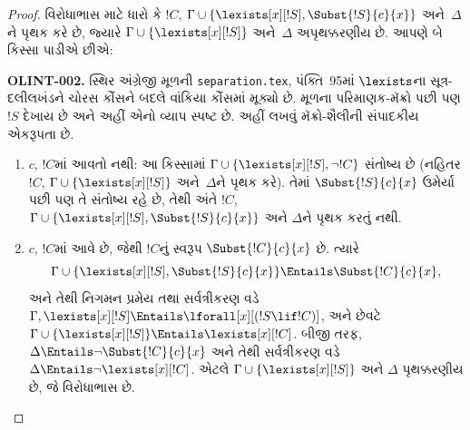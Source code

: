 \documentclass[../../../include/open-logic-section]{subfiles}
\begin{document}
\begin{proof}
વિરોધાભાસ માટે ધારો કે $!C$, $\Gamma \cup \{ \lexists[x][!S],
\Subst{!S}{c}{x}\}$ અને~$\Delta$ને પૃથક કરે છે, જ્યારે $\Gamma \cup
\{\lexists[x][!S] \}$ અને~$\Delta$ અપૃથક્કરણીય છે. આપણે બે કિસ્સા
પાડીએ છીએ:
\begin{editorial}
\textbf{OLINT-002.} સ્થિર અંગ્રેજી મૂળની \texttt{separation.tex}, પંક્તિ~95માં $\lexists$ના સૂત્ર-દલીલખંડને ચોરસ કૌંસને બદલે વાંકિયા કૌંસમાં મૂક્યો છે. મૂળના પરિમાણક-મૅક્રો પછી પણ $!S$ દેખાય છે અને અહીં એનો વ્યાપ સ્પષ્ટ છે. અહીં \texttt{\string\lexists[x][!S]} લખવું મૅક્રો-શૈલીની સંપાદકીય એકરૂપતા છે.
\end{editorial}
\begin{enumerate}
\item $c$, $!C$માં આવતો નથી: આ કિસ્સામાં $\Gamma \cup
  \{\lexists[x][!S], \lnot!C \}$ સંતોષ્ય છે (નહિતર $!C$, $\Gamma
  \cup \{\lexists[x][!S] \}$ અને~$\Delta$ને પૃથક કરે). તેમાં
  $\Subst{!S}{c}{x}$ ઉમેર્યા પછી પણ તે સંતોષ્ય રહે છે, તેથી અંતે
  $!C$, $\Gamma \cup \{ \lexists[x][!S], \Subst{!S}{c}{x} \}$ અને
  $\Delta$ને પૃથક કરતું નથી.
\item $c$, $!C$માં આવે છે, જેથી $!C$નું સ્વરૂપ
  $\Subst{!C}{c}{x}$ છે. ત્યારે
  \[
  \Gamma \cup \{ \lexists[x][!S], \Subst{!S}{c}{x}\} \Entails \Subst{!C}{c}{x},
  \]
  અને તેથી નિગમન પ્રમેય તથા સર્વત્રીકરણ વડે
  $\Gamma, \lexists[x][!S] \Entails \lforall[x][(!S \lif !C)]$,
  અને છેવટે $\Gamma \cup \{ \lexists[x][!S] \} \Entails
  \lexists[x][!C]$. બીજી તરફ, $\Delta \Entails \lnot
  \Subst{!C}{c}{x}$ અને તેથી સર્વત્રીકરણ વડે $\Delta \Entails \lnot
  \lexists[x][!C]$. એટલે $\Gamma \cup \{\lexists[x][!S] \}$ અને
  $\Delta$ પૃથક્કરણીય છે, જે વિરોધાભાસ છે.
\end{enumerate}
\end{proof}
\end{document}
